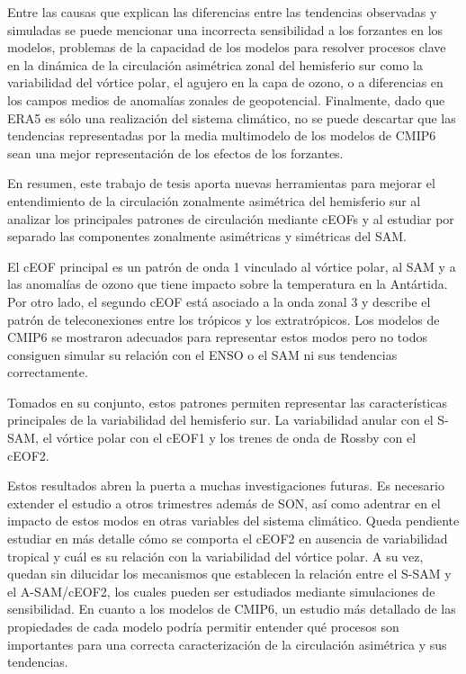 \documentclass[12pt,oneside,a4paper]{reedthesis}
\begin{document}
Entre las causas que explican las diferencias entre las tendencias observadas y simuladas se puede mencionar una incorrecta sensibilidad a los forzantes en los modelos, problemas de la capacidad de los modelos para resolver procesos clave en la dinámica de la circulación asimétrica zonal del hemisferio sur como la variabilidad del vórtice polar, el agujero en la capa de ozono, o a diferencias en los campos medios de anomalías zonales de geopotencial.
Finalmente, dado que ERA5 es sólo una realización del sistema climático, no se puede descartar que las tendencias representadas por la media multimodelo de los modelos de CMIP6 sean una mejor representación de los efectos de los forzantes.

En resumen, este trabajo de tesis aporta nuevas herramientas para mejorar el entendimiento de la circulación zonalmente asimétrica del hemisferio sur al analizar los principales patrones de circulación mediante cEOFs y al estudiar por separado las componentes zonalmente asimétricas y simétricas del SAM.

El cEOF principal es un patrón de onda 1 vinculado al vórtice polar, al SAM y a las anomalías de ozono que tiene impacto sobre la temperatura en la Antártida.
Por otro lado, el segundo cEOF está asociado a la onda zonal 3 y describe el patrón de teleconexiones entre los trópicos y los extratrópicos.
Los modelos de CMIP6 se mostraron adecuados para representar estos modos pero no todos consiguen simular su relación con el ENSO o el SAM ni sus tendencias correctamente.

Tomados en su conjunto, estos patrones permiten representar las características principales de la variabilidad del hemisferio sur.
La variabilidad anular con el S-SAM, el vórtice polar con el cEOF1 y los trenes de onda de Rossby con el cEOF2.

Estos resultados abren la puerta a muchas investigaciones futuras.
Es necesario extender el estudio a otros trimestres además de SON, así como adentrar en el impacto de estos modos en otras variables del sistema climático.
Queda pendiente estudiar en más detalle cómo se comporta el cEOF2 en ausencia de variabilidad tropical y cuál es su relación con la variabilidad del vórtice polar.
A su vez, quedan sin dilucidar los mecanismos que establecen la relación entre el S-SAM y el A-SAM/cEOF2, los cuales pueden ser estudiados mediante simulaciones de sensibilidad.
En cuanto a los modelos de CMIP6, un estudio más detallado de las propiedades de cada modelo podría permitir entender qué procesos son importantes para una correcta caracterización de la circulación asimétrica y sus tendencias.
\end{document}

